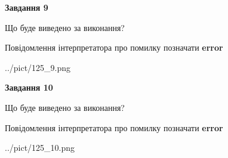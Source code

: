 \documentclass[12pt, ukrainian]{article}
\begin{document}
{{\begin {center}\textbf{Завдання 9}\end {center}}\par
Що буде виведено за виконання? \par
Повідомлення інтерпретатора про помилку позначати \textbf{error}

\begin{center}
	{../pict/125_9.png}
\end{center}
\newpage

{\begin {center}\textbf{Завдання 10}\end {center}}\par
Що буде виведено за виконання? \par
Повідомлення інтерпретатора про помилку позначати \textbf{error}

\begin{center}
	{../pict/125_10.png}
\end{center}
\newpage

}
\end{document}
